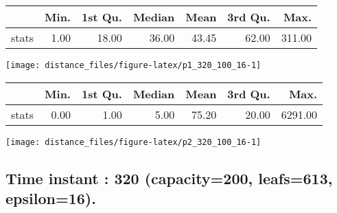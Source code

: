 \documentclass[
  9pt,
  landscape]{article}
\begin{document}
\begin{minipage}{0.5\textwidth} 
\centering 
\begin{tabular}{rrrrrrr}
  \hline
 & Min. & 1st Qu. & Median & Mean & 3rd Qu. & Max. \\ 
  \hline
stats & 1.00 & 18.00 & 36.00 & 43.45 & 62.00 & 311.00 \\ 
   \hline
\end{tabular}
\vspace{0.5cm} 


\texttt{[image: distance\_files/figure-latex/p1\_320\_100\_16-1]} 

\end{minipage} 
\begin{minipage}{0.5\textwidth} 
\centering 
\begin{tabular}{rrrrrrr}
  \hline
 & Min. & 1st Qu. & Median & Mean & 3rd Qu. & Max. \\ 
  \hline
stats & 0.00 & 1.00 & 5.00 & 75.20 & 20.00 & 6291.00 \\ 
   \hline
\end{tabular}
\vspace{0.5cm} 


\texttt{[image: distance\_files/figure-latex/p2\_320\_100\_16-1]} 

\end{minipage}

\pagebreak

\hypertarget{time-instant-320-capacity200-leafs613-epsilon16.}{%
\subsection{Time instant : 320 (capacity=200, leafs=613,
epsilon=16).}\label{time-instant-320-capacity200-leafs613-epsilon16.}}
\end{document}
